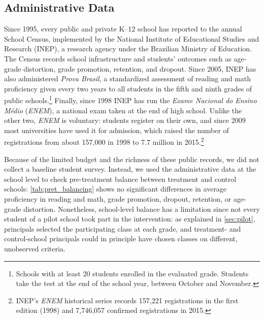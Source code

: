 \subsection{Administrative Data}

Since 1995, every public and private K--12 school has reported to the annual School Census, implemented by the National Institute of Educational Studies and Research (INEP), a research agency under the Brazilian Ministry of Education. The Census records school infrastructure and students' outcomes such as age-grade distortion, grade promotion, retention, and dropout. Since 2005, INEP has also administered \textit{Prova Brasil}, a standardized assessment of reading and math proficiency given every two years to all students in the fifth and ninth grades of public schools.\footnote{Schools with at least 20 students enrolled in the evaluated grade. Students take the test at the end of the school year, between October and November.} Finally, since 1998 INEP has run the \textit{Exame Nacional do Ensino M\'edio} (\textit{ENEM}), a national exam taken at the end of high school. Unlike the other two, \textit{ENEM} is voluntary: students register on their own, and since 2009 most universities have used it for admission, which raised the number of registrations from about 157{,}000 in 1998 to 7.7 million in 2015.\footnote{INEP's \textit{ENEM} historical series records 157,221 registrations in the first edition (1998) and 7,746,057 confirmed registrations in 2015.}

Because of the limited budget and the richness of these public records, we did not collect a baseline student survey. Instead, we used the administrative data at the school level to check pre-treatment balance between treatment and control schools: \autoref{tab:pret_balancing} shows no significant differences in average proficiency in reading and math, grade promotion, dropout, retention, or age-grade distortion. Nonetheless, school-level balance has a limitation since not every student of a pilot school took part in the intervention: as explained in \autoref{sec:pilot}, principals selected the participating class at each grade, and treatment- and control-school principals could in principle have chosen classes on different, unobserved criteria.

